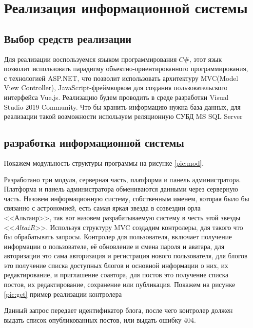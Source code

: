 \section{Реализация информационной системы}
\subsection{Выбор средств реализации}

Для реализации воспользуемся языком программирования $C\#$, этот язык позволит использовать парадигму объектно-ориентированного программирования, с технологией ASP.NET, что позволит использовать архитектуру MVC(Model View Controller), JavaScript-фреймворком для создания пользовательского интерфейса Vue.js. Реализацию будем проводить в среде разработки Visual Studio 2019 Community. Что бы хранить информацию нужна база данных, для реализации такой возможности используем реляционную СУБД MS SQL Server

\subsection{разработка информационной системы}

Покажем модульность структуры программы на рисунке \ref{pic:mod}.



Разработано три модуля, серверная часть, платформа и панель администратора. Платформа и панель администратора обмениваются данными через серверную часть. Назовем информационную систему, собственным именем, которая было бы связанно с астрономией, есть самая яркая звезда в созвездии орла <<Альтаир>>, так вот назовем разрабатываемую систему в честь этой звезды <<$AltaiR$>>. Используя структуру MVC создадим контролеры, для такого что бы обрабатывать запросы. Контролер для пользователя, включает получение информации о пользователе, её обновление и смена пароля и аватара, для авторизации это сама авторизация и регистрация нового пользователя, для блогов это получение списка доступных блогов и основной информации о них, их редактирование, и приглашение соавтора, для постов это получение списка постов, их редактирование, сохранение или публикация. Покажем на рисунке \ref{pic:get} пример реализации контролера


Данный запрос передает идентификатор блога, после чего контролер должен выдать список опубликованных постов, или выдать ошибку 404.

